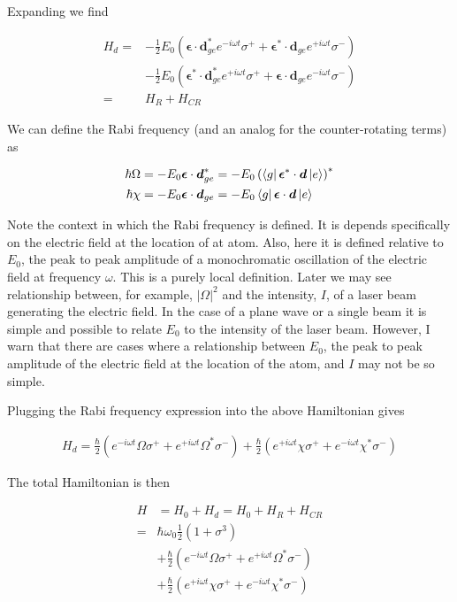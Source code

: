\documentclass[12pt]{article}
\newcommand{\bv}[1]{\boldsymbol{#1}}
\begin{document}
Expanding we find

\begin{align}
H_d = &-\frac{1}{2}E_0\left(\bv{\epsilon}\cdot\bv{d}^*_{ge}e^{-i\omega t}\sigma^+ + \bv{\epsilon}^*\cdot\bv{d}_{ge}e^{+i\omega t}\sigma^-\right)\\
& -\frac{1}{2}E_0\left(\bv{\epsilon}^*\cdot\bv{d}^*_{ge}e^{+i\omega t}\sigma^+ + \bv{\epsilon}\cdot\bv{d}_{ge}e^{-i\omega t}\sigma^-\right)\\
= &H_R + H_{CR}
\end{align}

We can define the Rabi frequency (and an analog for the counter-rotating terms) as

\begin{align}
\hbar \Omega &= -E_0 \bv{\epsilon}\cdot \bv{d}^*_{ge} = -E_0 \left(\bra{g}\bv{\epsilon}^*\cdot\bv{d}\ket{e}\right)^*\\
\hbar \chi &= -E_0 \bv{\epsilon}\cdot\bv{d}_{ge} = -E_0\bra{g}\bv{\epsilon}\cdot\bv{d}\ket{e}
\end{align}

Note the context in which the Rabi frequency is defined. It is depends specifically on the electric field at the location of at atom. Also, here it is defined relative to $E_0$, the peak to peak amplitude of a monochromatic oscillation of the electric field at frequency $\omega$. This is a purely local definition. Later we may see relationship between, for example, $|\Omega|^2$ and the intensity, $I$, of a laser beam generating the electric field. In the case of a plane wave or a single beam it is simple and possible to relate $E_0$ to the intensity of the laser beam. However, I warn that there are cases where a relationship between $E_0$, the peak to peak amplitude of the electric field at the location of the atom, and $I$ may not be so simple. 

Plugging the Rabi frequency expression into the above Hamiltonian gives

\begin{align}
H_d = \frac{\hbar}{2}\left(e^{-i\omega t}\Omega\sigma^+ +  e^{+i\omega t}\Omega^* \sigma^- \right) + \frac{\hbar}{2}\left( e^{+i\omega t}\chi\sigma^+ + e^{-i\omega t}\chi^* \sigma^- \right)
\end{align}

The total Hamiltonian is then

\begin{align}
H &= H_0 + H_d = H_0 + H_R + H_{CR}\\
= &\hbar \omega_0 \frac{1}{2}\left(1+\sigma^3\right)\\
&+ \frac{\hbar}{2}\left(e^{-i\omega t}\Omega\sigma^+ +  e^{+i\omega t}\Omega^* \sigma^- \right)\\
&+ \frac{\hbar}{2}\left( e^{+i\omega t}\chi\sigma^+ + e^{-i\omega t}\chi^* \sigma^- \right)\\
\end{align}
\end{document}

